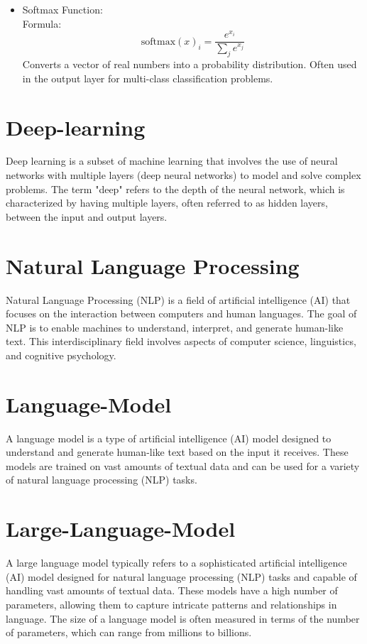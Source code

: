 \begin{itemize}
\item         Softmax Function:\\
        Formula: 
\begin{equation}
\text{softmax}(x)_i = \frac{e^{x_i}}{\sum_j e^{x_j}}
\end{equation}
        Converts a vector of real numbers into a probability distribution. Often used in the output layer for multi-class classification problems.
\end{itemize}






\section{Deep-learning}
Deep learning is a subset of machine learning that involves the use of neural networks with multiple layers (deep neural networks) to model and solve complex problems. The term "deep" refers to the depth of the neural network, which is characterized by having multiple layers, often referred to as hidden layers, between the input and output layers.

\section{Natural Language Processing}
\cite{Rus2013}
Natural Language Processing (NLP) is a field of artificial intelligence (AI) that focuses on the interaction between computers and human languages. The goal of NLP is to enable machines to understand, interpret, and generate human-like text. This interdisciplinary field involves aspects of computer science, linguistics, and cognitive psychology.

\section{Language-Model}
A language model is a type of artificial intelligence (AI) model designed to understand and generate human-like text based on the input it receives. These models are trained on vast amounts of textual data and can be used for a variety of natural language processing (NLP) tasks.


\section{Large-Language-Model}
A large language model typically refers to a sophisticated artificial intelligence (AI) model designed for natural language processing (NLP) tasks and capable of handling vast amounts of textual data. These models have a high number of parameters, allowing them to capture intricate patterns and relationships in language. The size of a language model is often measured in terms of the number of parameters, which can range from millions to billions.



